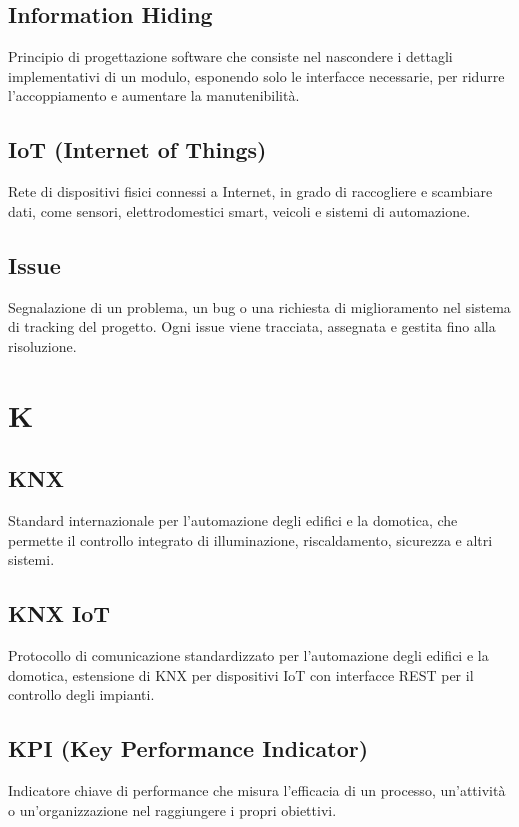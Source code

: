 \documentclass[a4paper,11pt]{article}
\begin{document}
\subsection{Information Hiding}
Principio di progettazione software che consiste nel nascondere i dettagli implementativi di un modulo, esponendo solo le interfacce necessarie, per ridurre l'accoppiamento e aumentare la manutenibilità.

\subsection{IoT (Internet of Things)}
Rete di dispositivi fisici connessi a Internet, in grado di raccogliere e scambiare dati, come sensori, elettrodomestici smart, veicoli e sistemi di automazione.

\subsection{Issue}
Segnalazione di un problema, un bug o una richiesta di miglioramento nel sistema di tracking del progetto. Ogni issue viene tracciata, assegnata e gestita fino alla risoluzione.

\newpage
\section{K}

\subsection{KNX}
Standard internazionale per l'automazione degli edifici e la domotica, che permette il controllo integrato di illuminazione, riscaldamento, sicurezza e altri sistemi.

\subsection{KNX IoT}
Protocollo di comunicazione standardizzato per l'automazione degli edifici e la domotica, estensione di KNX per dispositivi IoT con interfacce REST per il controllo degli impianti.

\subsection{KPI (Key Performance Indicator)}
Indicatore chiave di performance che misura l'efficacia di un processo, un'attività o un'organizzazione nel raggiungere i propri obiettivi.
\end{document}
